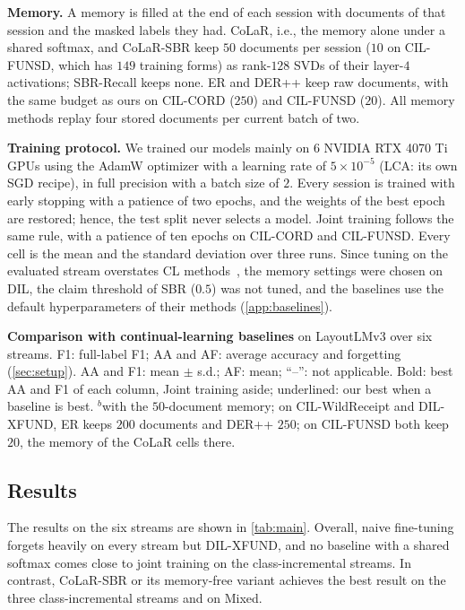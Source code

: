 \documentclass[10pt,twocolumn,letterpaper]{article}
\newcommand{\runin}[1]{\par\addvspace{0.7ex plus .3ex minus .1ex}\noindent\textbf{#1}\hspace{1em}\ignorespaces}
\begin{document}
\runin{Memory.} A memory is filled at the end of each session with documents of that session and the masked labels they had. CoLaR, i.e., the memory alone under a shared softmax, and CoLaR-SBR keep $50$ documents per session ($10$ on CIL-FUNSD, which has $149$ training forms) as rank-$128$ SVDs of their layer-$4$ activations; SBR-Recall keeps none. ER and DER++ keep raw documents, with the same budget as ours on CIL-CORD ($250$) and CIL-FUNSD ($20$). All memory methods replay four stored documents per current batch of two.

\runin{Training protocol.}\label{sec:protocol} We trained our models mainly on 6 NVIDIA RTX 4070 Ti GPUs using the AdamW optimizer with a learning rate of $5{\times}10^{-5}$ (LCA: its own SGD recipe), in full precision with a batch size of $2$. Every session is trained with early stopping with a patience of two epochs, and the weights of the best epoch are restored; hence, the test split never selects a model. Joint training follows the same rule, with a patience of ten epochs on CIL-CORD and CIL-FUNSD. Every cell is the mean and the standard deviation over three runs. Since tuning on the evaluated stream overstates CL methods~\citep{cha2025hyperparameters}, the memory settings were chosen on DIL, the claim threshold of SBR ($0.5$) was not tuned, and the baselines use the default hyperparameters of their methods (\cref{app:baselines}).

\begin{table}[t]
\centering\small
\setlength{\tabcolsep}{4pt}
\caption{\textbf{Comparison with continual-learning baselines} on LayoutLMv3 over six streams. F1: full-label F1; AA and AF: average accuracy and forgetting (\cref{sec:setup}). AA and F1: mean $\pm$ s.d.; AF: mean; ``--'': not applicable. Bold: best AA and F1 of each column, Joint training aside; underlined: our best when a baseline is best. $^{b}$with the $50$-document memory; on CIL-WildReceipt and DIL-XFUND, ER keeps $200$ documents and DER++ $250$; on CIL-FUNSD both keep $20$, the memory of the CoLaR cells there.}
\label{tab:main}
\resizebox{\linewidth}{!}{}
\end{table}

\subsection{Results}
\label{sec:beyond}
The results on the six streams are shown in \cref{tab:main}. Overall, naive fine-tuning forgets heavily on every stream but DIL-XFUND, and no baseline with a shared softmax comes close to joint training on the class-incremental streams. In contrast, CoLaR-SBR or its memory-free variant achieves the best result on the three class-incremental streams and on Mixed.
\end{document}
